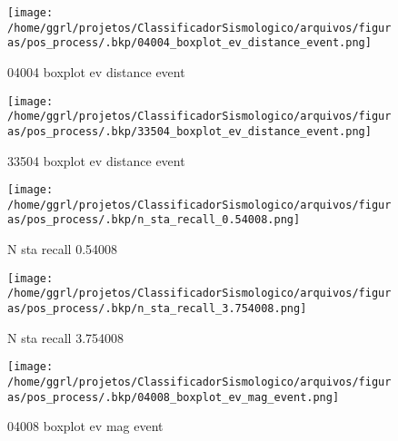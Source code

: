                     \begin{figure}[H]
                        \centering
                        \texttt{[image: /home/ggrl/projetos/ClassificadorSismologico/arquivos/figuras/pos\_process/.bkp/04004\_boxplot\_ev\_distance\_event.png]}
                        \caption{04004 boxplot ev distance event}
                        \label{fig:04004_boxplot_ev_distance_event}
                    \end{figure}
                

                    \begin{figure}[H]
                        \centering
                        \texttt{[image: /home/ggrl/projetos/ClassificadorSismologico/arquivos/figuras/pos\_process/.bkp/33504\_boxplot\_ev\_distance\_event.png]}
                        \caption{33504 boxplot ev distance event}
                        \label{fig:33504_boxplot_ev_distance_event}
                    \end{figure}
                

                    \begin{figure}[H]
                        \centering
                        \texttt{[image: /home/ggrl/projetos/ClassificadorSismologico/arquivos/figuras/pos\_process/.bkp/n\_sta\_recall\_0.54008.png]}
                        \caption{N sta recall 0.54008}
                        \label{fig:n_sta_recall_0.54008}
                    \end{figure}
                

                    \begin{figure}[H]
                        \centering
                        \texttt{[image: /home/ggrl/projetos/ClassificadorSismologico/arquivos/figuras/pos\_process/.bkp/n\_sta\_recall\_3.754008.png]}
                        \caption{N sta recall 3.754008}
                        \label{fig:n_sta_recall_3.754008}
                    \end{figure}
                

                    \begin{figure}[H]
                        \centering
                        \texttt{[image: /home/ggrl/projetos/ClassificadorSismologico/arquivos/figuras/pos\_process/.bkp/04008\_boxplot\_ev\_mag\_event.png]}
                        \caption{04008 boxplot ev mag event}
                        \label{fig:04008_boxplot_ev_mag_event}
                    \end{figure}
                

